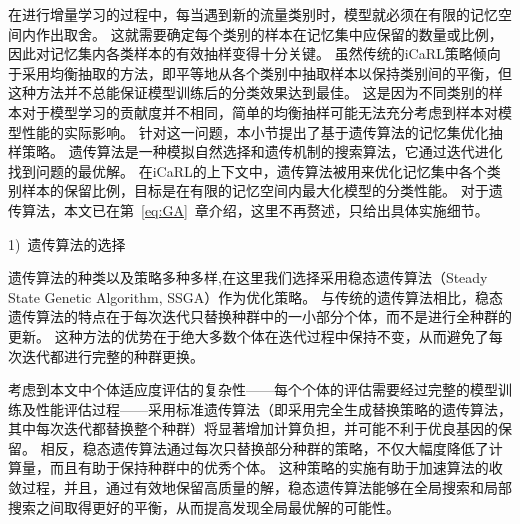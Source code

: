 

在进行增量学习的过程中，每当遇到新的流量类别时，模型就必须在有限的记忆空间内作出取舍。
这就需要确定每个类别的样本在记忆集中应保留的数量或比例，因此对记忆集内各类样本的有效抽样变得十分关键。
虽然传统的iCaRL策略倾向于采用均衡抽取的方法，即平等地从各个类别中抽取样本以保持类别间的平衡，但这种方法并不总能保证模型训练后的分类效果达到最佳。
这是因为不同类别的样本对于模型学习的贡献度并不相同，简单的均衡抽样可能无法充分考虑到样本对模型性能的实际影响。
针对这一问题，本小节提出了基于遗传算法的记忆集优化抽样策略。
遗传算法是一种模拟自然选择和遗传机制的搜索算法，它通过迭代进化找到问题的最优解。
在iCaRL的上下文中，遗传算法被用来优化记忆集中各个类别样本的保留比例，目标是在有限的记忆空间内最大化模型的分类性能。
对于遗传算法，本文已在第~\ref{eq:GA}~章介绍，这里不再赘述，只给出具体实施细节。\par

1)~遗传算法的选择\par
遗传算法的种类以及策略多种多样,在这里我们选择采用稳态遗传算法（Steady State Genetic Algorithm, SSGA）作为优化策略。
与传统的遗传算法相比，稳态遗传算法的特点在于每次迭代只替换种群中的一小部分个体，而不是进行全种群的更新。
这种方法的优势在于绝大多数个体在迭代过程中保持不变，从而避免了每次迭代都进行完整的种群更换。\par

考虑到本文中个体适应度评估的复杂性——每个个体的评估需要经过完整的模型训练及性能评估过程——采用标准遗传算法（即采用完全生成替换策略的遗传算法，其中每次迭代都替换整个种群）将显著增加计算负担，并可能不利于优良基因的保留。
相反，稳态遗传算法通过每次只替换部分种群的策略，不仅大幅度降低了计算量，而且有助于保持种群中的优秀个体。
这种策略的实施有助于加速算法的收敛过程，并且，通过有效地保留高质量的解，稳态遗传算法能够在全局搜索和局部搜索之间取得更好的平衡，从而提高发现全局最优解的可能性。\par

